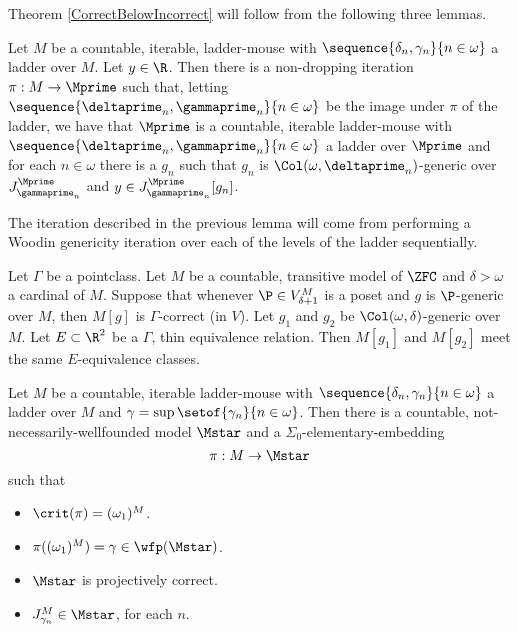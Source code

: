 \documentclass[oneside,12pt]{amsart}
\begin{document}
Theorem \ref{CorrectBelowIncorrect} will follow from the following three lemmas.

\begin{lemma}
\label{generic_over_all_windows}
Let $M$ be a countable, iterable, ladder-mouse
with $\sequence{\delta_n,\gamma_n}{n\in\omega}$ a ladder over $M$.
Let $y\in\R$.
Then there is a non-dropping iteration $\pi:M\to \Mprime$ such that,
letting $\sequence{\deltaprime_n,\gammaprime_n}{n\in\omega}$ be the image under $\pi$
of the ladder, we have that $\Mprime$ is a countable, iterable ladder-mouse
with $\sequence{\deltaprime_n,\gammaprime_n}{n\in\omega}$ a ladder over $\Mprime$
and for each $n\in\omega$ there is a $g_n$ such that $g_n$
is $\Col(\omega,\deltaprime_n)$-generic over
$J^{\Mprime}_{\gammaprime_n}$ and $y\in J^{\Mprime}_{\gammaprime_n}[g_n]$.
\end{lemma}

The iteration described in the previous lemma will come from performing a
Woodin genericity iteration over each of the levels of the ladder sequentially.

\begin{lemma}
\label{hjorthlemma}
Let $\Gamma$ be a pointclass.
Let $M$ be a countable, transitive model of $\ZFC$ and  $\delta>\omega$ a cardinal of $M$.
Suppose that whenever $\P\in V^M_{\delta+1}$ is a poset and $g$ is $\P$-generic over $M$, then
$M[g]$ is $\Gamma$-correct (in $V$). Let $g_1$ and $g_2$ be $\Col(\omega, \delta)$-generic over $M$.
Let $E\subset\R^2$ be a $\Gamma$, thin equivalence relation.
Then $M[g_1]$ and $M[g_2]$ meet the same $E$-equivalence classes.
\end{lemma}

\begin{lemma}
\label{m_star_existence}
Let $M$ be a countable, iterable ladder-mouse
with $\sequence{\delta_n,\gamma_n}{n\in\omega}$ a ladder over $M$ and
$\gamma=\sup\setof{\gamma_n}{n\in\omega}$. Then there is a countable,
not-necessarily-wellfounded model $\Mstar$ and a $\Sigma_0$-elementary-embedding
$$\pi:M\to\Mstar$$
such that
\begin{itemize}
\item $\crit(\pi) = (\omega_1)^M$.
\item $\pi((\omega_1)^M) = \gamma \in \wfp(\Mstar)$.
\item $\Mstar$ is projectively correct.
\item $J^{M}_{\gamma_n}\in\Mstar$, for each $n$.
\end{itemize}
\end{lemma}
\end{document}
